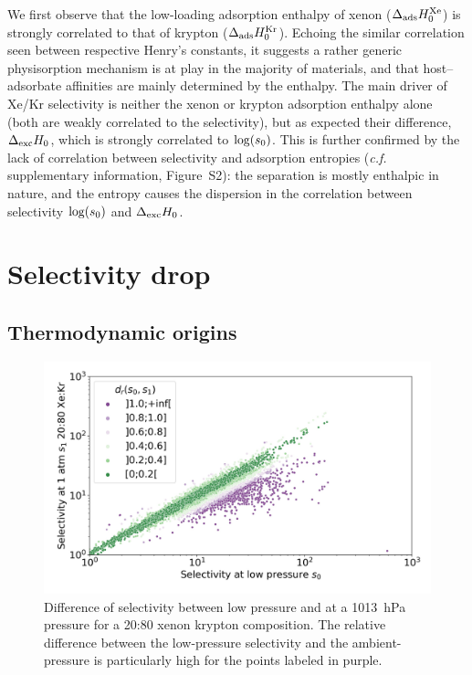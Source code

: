 \documentclass[main.tex]{subfiles}
\begin{document}
We first observe that the low-loading adsorption enthalpy of xenon ($\Delta_{\text{ads}}H^{\text{Xe}}_{\text{0}}$) is strongly correlated to that of krypton ($\Delta_{\text{ads}}H^{\text{Kr}}_{\text{0}}$). Echoing the similar correlation seen between respective Henry's constants, it suggests a rather generic physisorption mechanism is at play in the majority of materials, and that host--adsorbate affinities are mainly determined by the enthalpy. The main driver of Xe/Kr selectivity is neither the xenon or krypton adsorption enthalpy alone (both are weakly correlated to the selectivity), but as expected their difference, $\Delta_{\text{exc}}H_{\text{0}}$, which is strongly correlated to $\log(s_{\text{0}})$. This is further confirmed by the lack of correlation between selectivity and adsorption entropies (\emph{c.f.} supplementary information, Figure~S2): the separation is mostly enthalpic in nature, and the entropy causes the dispersion in the correlation between selectivity $\log(s_{\text{0}})$ and $\Delta_{\text{exc}}H_{\text{0}}$.

\section{Selectivity drop}

\subsection{Thermodynamic origins}\label{section:pressure}

\begin{figure}[t]
  \centering
    \includegraphics[width=0.7\linewidth]{figures/2-thermo/s_0_vs_s_2080_overview_log.jpg}
    \caption{Difference of selectivity between low pressure and at a \SI{1013}{\hecto\pascal} pressure for a 20:80 xenon krypton composition. The relative difference between the low-pressure selectivity and the ambient-pressure is particularly high for the points labeled in purple.}
    \label{fgr:overview}
  \end{figure}
  
\end{document}
